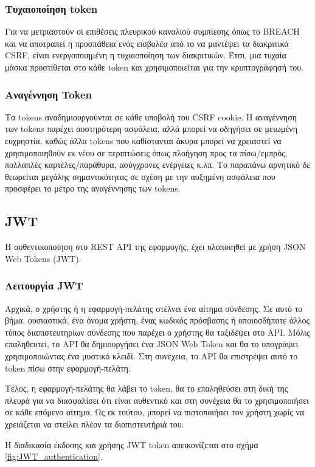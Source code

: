 \subsubsection{Τυχαιοποίηση token}
Για να μετριαστούν οι επιθέσεις πλευρικού καναλιού συμπίεσης όπως το BREACH και να αποτραπεί η προσπάθεια ενός εισβολέα από το να μαντέψει τα διακριτικά CSRF, είναι ενεργοποιημένη η τυχαιοποίηση των διακριτικών. Έτσι, μια τυχαία μάσκα προστίθεται στο κάθε token και χρησιμοποιείται για την κρυπτογράφησή του.

\subsubsection{Αναγέννηση Token}
Τα tokens αναδημιουργούνται σε κάθε υποβολή του CSRF cookie. Η αναγέννηση των tokens παρέχει αυστηρότερη ασφάλεια, αλλά μπορεί να οδηγήσει σε μειωμένη ευχρηστία, καθώς άλλα tokens που καθίστανται άκυρα μπορεί να χρειαστεί να χρησιμοποιηθούν εκ νέου σε περιπτώσεις όπως πλοήγηση προς τα πίσω/εμπρός, πολλαπλές καρτέλες/παράθυρα, ασύγχρονες ενέργειες κ.λπ. Το παραπάνω αρνητικό δε θεωρείται μεγάλης σημαντικότητας σε σχέση με την αυξημένη ασφάλεια που προσφέρει το μέτρο της αναγέννησης των tokens.

\subsection{JWT}
Η αυθεντικοποίηση στο REST API της εφαρμογής, έχει υλοποιηθεί με χρήση JSON Web Tokens (JWT).

\subsubsection{Λειτουργία JWT}
Αρχικά, ο χρήστης ή η εφαρμογή-πελάτης στέλνει ένα αίτημα σύνδεσης. Σε αυτό το βήμα, ουσιαστικά, ένα όνομα χρήστη, ένας κωδικός πρόσβασης ή οποιοσδήποτε άλλος τύπος διαπιστευτηρίων σύνδεσης που παρέχει ο χρήστης θα ταξιδέψει στο API. Μόλις επαληθευτεί, το API θα δημιουργήσει ένα JSON Web Token και θα το υπογράψει χρησιμοποιώντας ένα μυστικό κλειδί. Στη συνέχεια, το API θα επιστρέψει αυτό το token πίσω στην εφαρμογή-πελάτη.

Τέλος, η εφαρμογή-πελάτης θα λάβει το token, θα το επαληθεύσει στη δική της πλευρά για να διασφαλίσει ότι είναι αυθεντικό και στη συνέχεια θα το χρησιμοποιήσει σε κάθε επόμενο αίτημα. Ως εκ τούτου, μπορεί να πιστοποιήσει τον χρήστη χωρίς να χρειάζεται να στείλει πλέον τα διαπιστευτήριά του.

Η διαδικασία έκδοσης και χρήσης JWT token απεικονίζεται στο σχήμα \ref{fig:JWT_authentication}.

